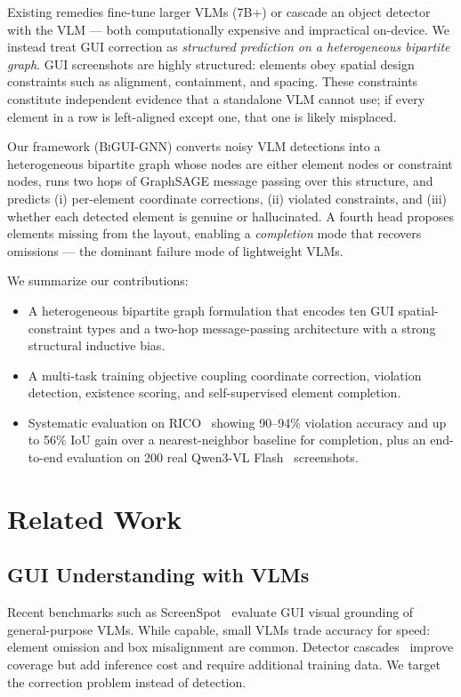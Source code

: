 \documentclass[conference]{IEEEtran}
\begin{document}
Existing remedies fine-tune larger VLMs (7B+) or cascade an object detector
with the VLM --- both computationally expensive and impractical on-device. We
instead treat GUI correction as \emph{structured prediction on a heterogeneous
bipartite graph}. GUI screenshots are highly structured: elements obey spatial
design constraints such as alignment, containment, and spacing. These
constraints constitute independent evidence that a standalone VLM cannot use;
if every element in a row is left-aligned except one, that one is likely
misplaced.

Our framework (\textsc{BiGUI-GNN}) converts noisy VLM detections into a
heterogeneous bipartite graph whose nodes are either element nodes or
constraint nodes, runs two hops of GraphSAGE message passing over this
structure, and predicts (i) per-element coordinate corrections, (ii) violated
constraints, and (iii) whether each detected element is genuine or
hallucinated. A fourth head proposes elements missing from the layout,
enabling a \emph{completion} mode that recovers omissions --- the dominant
failure mode of lightweight VLMs.

We summarize our contributions:
\begin{itemize}
\item A heterogeneous bipartite graph formulation that encodes ten GUI
spatial-constraint types and a two-hop message-passing architecture with a
strong structural inductive bias.
\item A multi-task training objective coupling coordinate correction,
violation detection, existence scoring, and self-supervised element
completion.
\item Systematic evaluation on RICO~\cite{dek.a17rico} showing 90--94\%
violation accuracy and up to 56\% IoU gain over a nearest-neighbor baseline
for completion, plus an end-to-end evaluation on 200 real Qwen3-VL
Flash~\cite{bai2023qwen} screenshots.
\end{itemize}

\section{Related Work}
\subsection{GUI Understanding with VLMs}
Recent benchmarks such as ScreenSpot~\cite{cheng2024screenspot} evaluate GUI
visual grounding of general-purpose VLMs. While capable, small VLMs trade
accuracy for speed: element omission and box misalignment are common.
Detector cascades~\cite{carion2020detr} improve coverage but add inference
cost and require additional training data. We target the correction problem
instead of detection.
\end{document}
